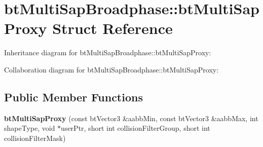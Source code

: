 \hypertarget{structbt_multi_sap_broadphase_1_1bt_multi_sap_proxy}{\section{bt\+Multi\+Sap\+Broadphase\+:\+:bt\+Multi\+Sap\+Proxy Struct Reference}
\label{structbt_multi_sap_broadphase_1_1bt_multi_sap_proxy}
}


Inheritance diagram for bt\+Multi\+Sap\+Broadphase\+:\+:bt\+Multi\+Sap\+Proxy\+:


Collaboration diagram for bt\+Multi\+Sap\+Broadphase\+:\+:bt\+Multi\+Sap\+Proxy\+:
\subsection*{Public Member Functions}
\begin{DoxyCompactItemize}
\item 
\hypertarget{structbt_multi_sap_broadphase_1_1bt_multi_sap_proxy_ace066c7cff3ec890a609ac5cb82718d0}{{\bfseries bt\+Multi\+Sap\+Proxy} (const bt\+Vector3 \&aabb\+Min, const bt\+Vector3 \&aabb\+Max, int shape\+Type, void $\ast$user\+Ptr, short int collision\+Filter\+Group, short int collision\+Filter\+Mask)}\label{structbt_multi_sap_broadphase_1_1bt_multi_sap_proxy_ace066c7cff3ec890a609ac5cb82718d0}

\end{DoxyCompactItemize}
